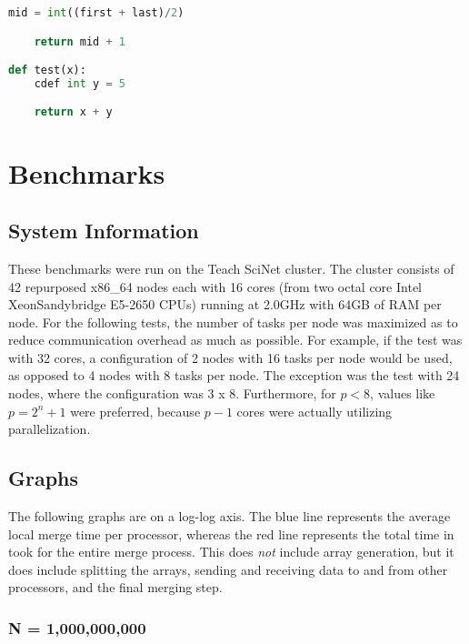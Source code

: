 \documentclass[12pt]{article}
\begin{document}
{\begin{lstlisting}[language={Python}]
        mid = int((first + last)/2)

    return mid + 1

def test(x):
    cdef int y = 5

    return x + y 
    \end{lstlisting}
    
    \newpage
    \section {Benchmarks}

\subsection {System Information}
These benchmarks were run on the Teach SciNet cluster. The cluster consists of 42 repurposed x86\_64 nodes each with 16 cores (from two octal core Intel XeonSandybridge E5-2650 CPUs) running at 2.0GHz with 64GB of RAM per node. For the following tests, the number of tasks per node was maximized as to reduce communication overhead as much as possible. For example, if the test was with 32 cores, a configuration of 2 nodes with 16 tasks per node would be used, as opposed to 4 nodes with 8 tasks per node. The exception was the test with 24 nodes, where the configuration was 3 x 8. Furthermore, for $p < 8$, values like $p = 2^n + 1$ were preferred, because $p-1$ cores were actually utilizing parallelization.

\subsection{Graphs}

The following graphs are on a log-log axis. The blue line represents the average local merge time per processor, whereas the red line represents the total time in took for the entire merge process. This does \emph{not} include array generation, but it does include splitting the arrays, sending and receiving data to and from other processors, and the final merging step.

\subsubsection{N = 1,000,000,000}

\mydata
\begin{tikzpicture}
   

\end{tikzpicture}}
\end{document}
